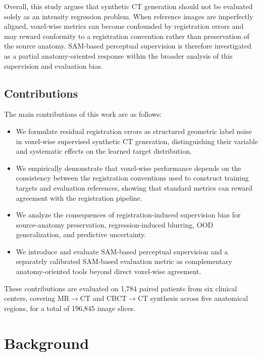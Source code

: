\documentclass[lettersize,journal]{IEEEtran}
\begin{document}
Overall, this study argues that synthetic CT generation should not be evaluated solely as an intensity regression problem. When reference images are imperfectly aligned, voxel-wise metrics can become confounded by registration errors and may reward conformity to a registration convention rather than preservation of the source anatomy. SAM-based perceptual supervision is therefore investigated as a partial anatomy-oriented response within the broader analysis of this supervision and evaluation bias.

\subsection*{Contributions}

The main contributions of this work are as follows:

\begin{itemize}

\item We formulate residual registration errors as structured geometric label noise in voxel-wise supervised synthetic CT generation, distinguishing their variable and systematic effects on the learned target distribution.

\item We empirically demonstrate that voxel-wise performance depends on the consistency between the registration conventions used to construct training targets and evaluation references, showing that standard metrics can reward agreement with the registration pipeline.

\item We analyze the consequences of registration-induced supervision bias for source-anatomy preservation, regression-induced blurring, OOD generalization, and predictive uncertainty.

\item We introduce and evaluate SAM-based perceptual supervision and a separately calibrated SAM-based evaluation metric as complementary anatomy-oriented tools beyond direct voxel-wise agreement.

\end{itemize}

These contributions are evaluated on 1,784 paired patients from six clinical centers, covering MR$\rightarrow$CT and CBCT$\rightarrow$CT synthesis across five anatomical regions, for a total of 196,845 image slices.

\section{Background}
\end{document}
